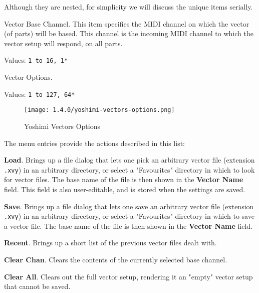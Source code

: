    Although they are nested, for simplicity we will discuss the unique items
   serially.

   \setcounter{ItemCounter}{0}      %

   Vector Base Channel.
   This item specifies the MIDI channel on which the vector (of parts) will be
   based.  This channel is the incoming MIDI channel to which the vector setup
   will respond, on all parts.

   Values: \texttt{1 to 16, 1*}

   Vector Options.

   Values: \texttt{1 to 127, 64*}

\begin{figure}[H]
   \centering
   \texttt{[image: 1.4.0/yoshimi-vectors-options.png]}
   \caption{Yoshimi Vectors Options}
   \label{fig:yoshimi_vectors_options}
\end{figure}

   The menu entries provide the actions described in this list:

   \begin{enumber}
      \item \textbf{Load}.
         Brings up a file dialog that lets one pick an arbitrary vector file
         (extension \texttt{.xvy}) in an arbitrary directory, or select a
         "Favourites" directory in which to look for vector files.
         The base name of the file is then shown in the \textbf{Vector Name}
         field.  This field is also user-editable, and is stored when the
         settings are saved.
      \item \textbf{Save}.
         Brings up a file dialog that lets one save an arbitrary vector file
         (extension \texttt{.xvy}) in an arbitrary directory, or select a
         "Favourites" directory in which to save a vector file.
         The base name of the file is then shown in the \textbf{Vector Name}
         field.
      \item \textbf{Recent}.
         Brings up a short list of the previous vector files dealt with.
      \item \textbf{Clear Chan}.
         Clears the contents of the currently selected base channel.
      \item \textbf{Clear All}.
         Clears out the full vector setup, rendering it an "empty" vector setup
         that cannot be saved.
   \end{enumber}

